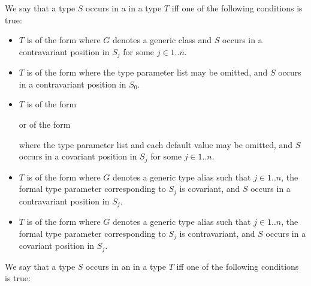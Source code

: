 \documentclass[makeidx]{article}
\begin{document}
\LMHash{}%
We say that a type $S$ occurs in a  in a type $T$
if{}f one of the following conditions is true:

\begin{itemize}
\item $T$ is of the form 
  where $G$ denotes a generic class
  and $S$ occurs in a contravariant position in $S_j$
  for some $j \in 1 .. n$.

\item $T$ is of the form
  where the type parameter list may be omitted,
  and $S$ occurs in a contravariant position in $S_0$.

\item $T$ is of the form



  \noindent
  or of the form



  \noindent
  where the type parameter list and each default value may be omitted,
  and $S$ occurs in a covariant position in $S_j$
  for some $j \in 1 .. n$.

\item $T$ is of the form 
  where $G$ denotes a generic type alias such that
  $j \in 1 .. n$,
  the formal type parameter corresponding to $S_j$ is covariant,
  and $S$ occurs in a contravariant position in $S_j$.

\item $T$ is of the form 
  where $G$ denotes a generic type alias such that
  $j \in 1 .. n$,
  the formal type parameter corresponding to $S_j$ is contravariant,
  and $S$ occurs in a covariant position in $S_j$.
\end{itemize}

\LMHash{}%
We say that a type $S$ occurs in an  in a type $T$
if{}f one of the following conditions is true:
\end{document}
